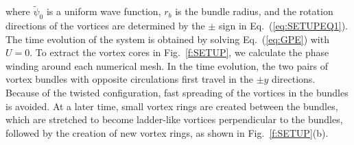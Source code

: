 \documentclass[aps,onecolumn,pra,longbibliography]{revtex4}
\begin{document}
	where $\tilde{\psi}_0$ is a uniform wave function,
	$r_b$ is the bundle radius,
	and the rotation directions of the vortices are
	determined by the $\pm$ sign in Eq.~(\ref{eq:SETUPEQ1}).
	The time evolution of the system is obtained by solving Eq.~(\ref{eq:GPE})
	with $U=0$.
	To extract the vortex cores in Fig.~\ref{f:SETUP},
	we calculate the phase winding around each numerical mesh.
	In the time evolution, the two pairs of vortex bundles
	with opposite circulations first travel in the $\pm y$ directions.
	Because of the twisted configuration, fast spreading of
	the vortices in the bundles is avoided.
	At a later time, small vortex rings are created
	between the bundles, which are stretched to become ladder-like vortices
	perpendicular to the bundles, followed by the creation
	of new vortex rings, as shown in Fig.~\ref{f:SETUP}(b).
\end{document}
